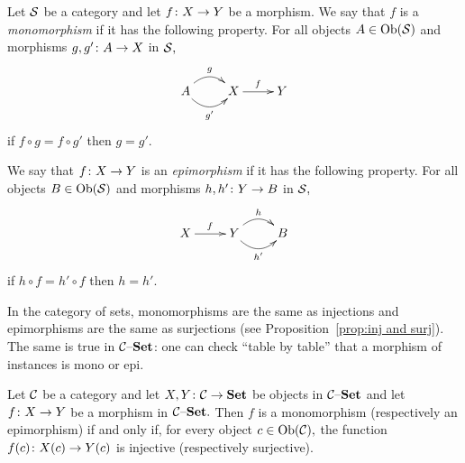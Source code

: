 \documentclass[CT4S-EN-RU]{subfiles}
\begin{document}
\begin{blockRUS}
\end{blockRUS}

\begin{definitionENG}\label{def:mono, epi}
Let $\mathcal{S}$ be a category and let $f\colon X\rightarrow Y$ be a morphism. We say that $f$ is a {\em monomorphism} if it has the following property. For all objects $A\in\operatorname{Ob}(\mathcal{S})$ and morphisms $g,g'\colon A\rightarrow X$ in $\mathcal{S},$ 
$$
\xymatrix{A\ar@/^1pc/[r]^g\ar@/_1pc/[r]_{g'}&X\ar[r]^f&Y}
$$
if $f\circ g=f\circ g'$ then $g=g'.$

We say that $f\colon X\rightarrow Y$ is an {\em epimorphism} if it has the following property. For all objects $B\in\operatorname{Ob}(\mathcal{S})$ and morphisms $h,h'\colon Y\rightarrow B$ in $\mathcal{S},$
$$
\xymatrix{X\ar[r]^f&Y\ar@/^1pc/[r]^h\ar@/_1pc/[r]_{h'}&B}
$$
if $h\circ f=h'\circ f$ then $h=h'.$
\end{definitionENG}

\begin{definitionRUS}\label{def:mono, epi}
\end{definitionRUS}

\begin{blockENG}
In the category of sets, monomorphisms are the same as injections and epimorphisms are the same as surjections (see Proposition~\ref{prop:inj and surj}). The same is true in $\mathcal{C}{\text \textendash}{\mathbf{Set}}$: one can check “table by table” that a morphism of instances is mono or epi.
\end{blockENG}

\begin{blockRUS}
\end{blockRUS}

\begin{propositionENG}\label{prop:epi mono in c-set}
Let $\mathcal{C}$ be a category and let $X,Y\colon\mathcal{C}\rightarrow{\mathbf{Set}}$ be objects in $\mathcal{C}{\text \textendash}{\mathbf{Set}}$ and let $f\colon X\rightarrow Y$ be a morphism in $\mathcal{C}{\text \textendash}{\mathbf{Set}}.$ Then $f$ is a monomorphism (respectively an epimorphism) if and only if, for every object $c\in\operatorname{Ob}(\mathcal{C}),$ the function $f(c)\colon X(c)\rightarrow Y(c)$ is injective (respectively surjective). 
\end{propositionENG}

\begin{propositionRUS}\label{prop:epi mono in c-set}
\end{propositionRUS}
\end{document}
